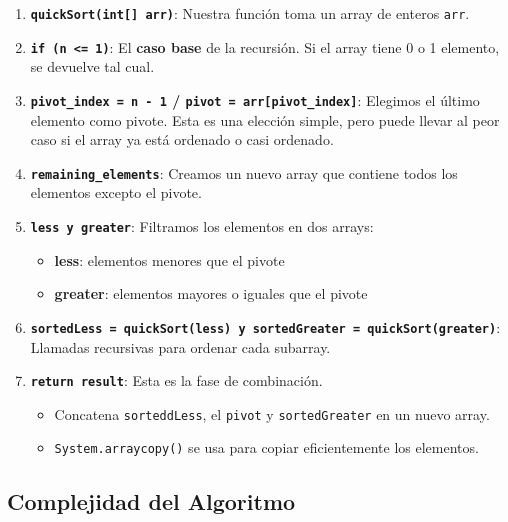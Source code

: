 \documentclass[
  spanish,
  letterpaper,
  DIV=11,
  numbers=noendperiod]{scrreprt}
\providecommand{\tightlist}{%
  \setlength{\itemsep}{0pt}\setlength{\parskip}{0pt}}
\begin{document}
\begin{enumerate}
\def\labelenumi{\arabic{enumi}.}
\tightlist
\item
  \textbf{\texttt{quickSort(int{[}{]}\ arr)}}: Nuestra función toma un
  array de enteros \texttt{arr}.
\item
  \textbf{\texttt{if\ (n\ \textless{}=\ 1)}}: El \textbf{caso base} de
  la recursión. Si el array tiene 0 o 1 elemento, se devuelve tal cual.
\item
  \textbf{\texttt{pivot\_index\ =\ n\ -\ 1} /
  \texttt{pivot\ =\ arr{[}pivot\_index{]}}}: Elegimos el último elemento
  como pivote. Esta es una elección simple, pero puede llevar al peor
  caso si el array ya está ordenado o casi ordenado.
\item
  \textbf{\texttt{remaining\_elements}}: Creamos un nuevo array que
  contiene todos los elementos excepto el pivote.
\item
  \textbf{\texttt{less\ y\ greater}}: Filtramos los elementos en dos
  arrays:

  \begin{itemize}
  \tightlist
  \item
    \textbf{less}: elementos menores que el pivote
  \item
    \textbf{greater}: elementos mayores o iguales que el pivote
  \end{itemize}
\item
  \textbf{\texttt{sortedLess\ =\ quickSort(less)\ y\ sortedGreater\ =\ quickSort(greater)}}:
  Llamadas recursivas para ordenar cada subarray.
\item
  \textbf{\texttt{return\ result}}: Esta es la fase de combinación.

  \begin{itemize}
  \tightlist
  \item
    Concatena \texttt{sorteddLess}, el \texttt{pivot} y
    \texttt{sortedGreater} en un nuevo array.
  \item
    \texttt{System.arraycopy()} se usa para copiar eficientemente los
    elementos.
  \end{itemize}
\end{enumerate}

\subsection{Complejidad del
Algoritmo}\label{complejidad-del-algoritmo-3}
\end{document}
